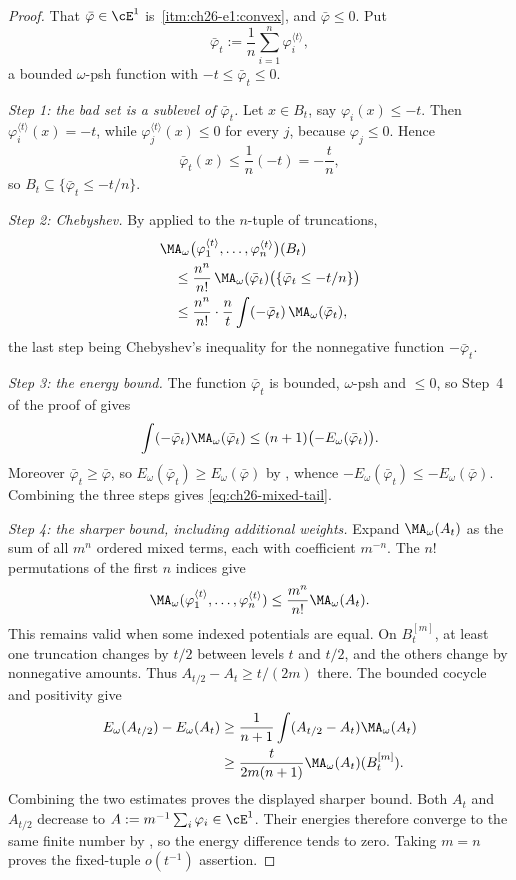 \begin{proof}
That $\bar\varphi\in\cE^1$ is
\,\cref{itm:ch26-e1:convex}, and
$\bar\varphi\leq0$.  Put
\[
 \bar\varphi_t:=\frac1n\sum_{i=1}^n\varphi_i^{\langle t\rangle},
\]
a bounded $\omega$-psh function with $-t\leq\bar\varphi_t\leq0$.

\emph{Step 1: the bad set is a sublevel of $\bar\varphi_t$.}  Let
$x\in B_t$, say $\varphi_i(x)\leq-t$.  Then
$\varphi_i^{\langle t\rangle}(x)=-t$, while
$\varphi_j^{\langle t\rangle}(x)\leq0$ for every $j$, because
$\varphi_j\leq0$.  Hence
\[
 \bar\varphi_t(x)\leq\frac1n(-t)=-\frac tn ,
\]
so $B_t\subseteq\{\bar\varphi_t\leq-t/n\}$.

\emph{Step 2: Chebyshev.}  By  applied to
the $n$-tuple of truncations,
\[
 \begin{aligned}
 &\MA_\omega\bigl(\varphi_1^{\langle t\rangle},\ldots,
    \varphi_n^{\langle t\rangle}\bigr)(B_t)\\
 &\quad\leq\frac{n^n}{n!}\,
   \MA_\omega(\bar\varphi_t)
      \bigl(\{\bar\varphi_t\leq-t/n\}\bigr)\\
 &\quad\leq\frac{n^n}{n!}\cdot\frac{n}{t}
   \int(-\bar\varphi_t)\,\MA_\omega(\bar\varphi_t),
 \end{aligned}
\]
the last step being Chebyshev's inequality for the nonnegative function
$-\bar\varphi_t$.

\emph{Step 3: the energy bound.}  The function $\bar\varphi_t$ is bounded,
$\omega$-psh and $\leq0$, so Step~4 of the proof of
 gives
\[
 \int(-\bar\varphi_t)\MA_\omega(\bar\varphi_t)
 \leq(n+1)\bigl(-E_\omega(\bar\varphi_t)\bigr).
\]
Moreover $\bar\varphi_t\geq\bar\varphi$, so
$E_\omega(\bar\varphi_t)\geq E_\omega(\bar\varphi)$ by
, whence
$-E_\omega(\bar\varphi_t)\leq-E_\omega(\bar\varphi)$.  Combining the three
steps gives \eqref{eq:ch26-mixed-tail}.

\emph{Step 4: the sharper bound, including additional weights.}
Expand $\MA_\omega(A_t)$ as the sum of all $m^n$ ordered mixed terms,
each with coefficient $m^{-n}$.  The $n!$ permutations of the first $n$
indices give
\[
 \MA_\omega(\varphi_1^{\langle t\rangle},\ldots,
              \varphi_n^{\langle t\rangle})
 \leq\frac{m^n}{n!}\MA_\omega(A_t).
\]
This remains valid when some indexed potentials are equal.
On $B_t^{[m]}$, at least one truncation changes by $t/2$ between
levels $t$ and $t/2$, and the others change by nonnegative amounts.  Thus
$A_{t/2}-A_t\geq t/(2m)$ there.  The bounded cocycle and positivity give
\[
 \begin{aligned}
 E_\omega(A_{t/2})-E_\omega(A_t)
 &\geq\frac1{n+1}\int(A_{t/2}-A_t)\MA_\omega(A_t)\\
 &\geq\frac{t}{2m(n+1)}\MA_\omega(A_t)(B_t^{[m]}).
 \end{aligned}
\]
Combining the two estimates proves the displayed sharper bound.
Both $A_t$ and $A_{t/2}$ decrease to
$A:=m^{-1}\sum_i\varphi_i\in\cE^1$.  Their energies therefore converge
to the same finite number by , so the
energy difference tends to zero.  Taking $m=n$ proves the fixed-tuple
$o(t^{-1})$ assertion.
\end{proof}


